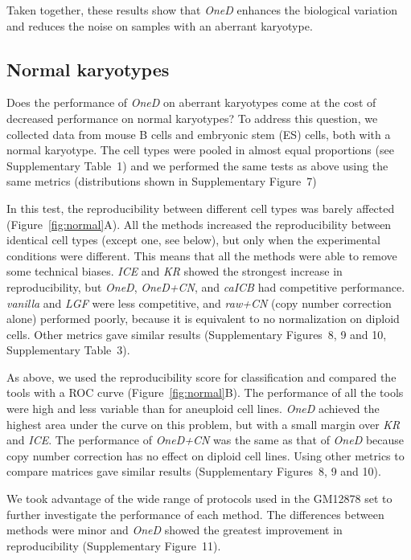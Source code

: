 \documentclass[a4,center,fleqn]{NAR}
\begin{document}
Taken together, these results show that \textit{OneD} enhances the
biological variation and reduces the noise on samples with an aberrant
karyotype.




\subsection{Normal karyotypes}

Does the performance of \textit{OneD} on aberrant karyotypes come at the
cost of decreased performance on normal karyotypes? To address this
question, we collected data from mouse B cells and embryonic stem (ES)
cells, both with a normal karyotype. The cell types were pooled in almost
equal proportions (see Supplementary Table~1) and we performed the same
tests as above using the same metrics (distributions shown in
Supplementary Figure~7)

In this test, the reproducibility between different cell types was barely
affected (Figure~\ref{fig:normal}A). All the methods increased the
reproducibility between identical cell types (except one, see below), but
only when the experimental conditions were different. This means that all
the methods were able to remove some technical biases. \textit{ICE} and
\textit{KR} showed the strongest increase in reproducibility, but
\textit{OneD}, \textit{OneD+CN}, and \textit{caICB} had competitive
performance. \textit{vanilla} and \textit{LGF} were less competitive, and
\textit{raw+CN} (copy number correction alone) performed poorly, because
it is equivalent to no normalization on diploid cells. Other metrics gave
similar results (Supplementary Figures~8, 9 and 10, Supplementary Table~3).

As above, we used the reproducibility score for classification and
compared the tools with a ROC curve (Figure~\ref{fig:normal}B). The
performance of all the tools were high and less variable than for
aneuploid cell lines. \textit{OneD} achieved the highest area under the
curve on this problem, but with a small margin over \textit{KR} and
\textit{ICE}. The performance of \textit{OneD+CN} was the same as that of
\textit{OneD} because copy number correction has no effect on diploid cell
lines. Using other metrics to compare matrices gave similar results
(Supplementary Figures~8, 9 and 10).

We took advantage of the wide range of protocols used in the GM12878 set to
further investigate the performance of each method. The differences between
methods were minor and \textit{OneD} showed the greatest improvement in
reproducibility (Supplementary Figure~11).
\end{document}
